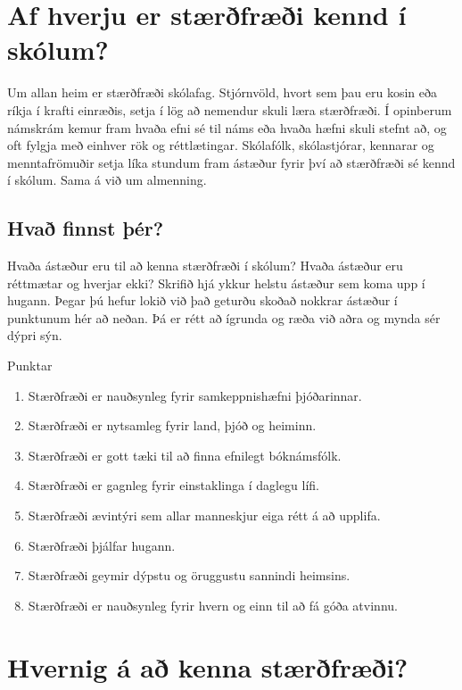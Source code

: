 \documentclass[
  icelandic,
]{book}
\providecommand{\tightlist}{%
  \setlength{\itemsep}{0pt}\setlength{\parskip}{0pt}}
\begin{document}
\section{Af hverju er stærðfræði kennd í skólum?}\label{af-hverju-stae}

Um allan heim er stærðfræði skólafag. Stjórnvöld, hvort sem þau eru kosin eða ríkja í krafti einræðis, setja í lög að nemendur skuli læra stærðfræði. Í opinberum námskrám kemur fram hvaða efni sé til náms eða hvaða hæfni skuli stefnt að, og oft fylgja með einhver rök og réttlætingar. Skólafólk, skólastjórar, kennarar og menntafrömuðir setja líka stundum fram ástæður fyrir því að stærðfræði sé kennd í skólum. Sama á við um almenning.

\subsection{Hvað finnst þér?}\label{thinar-astaedur}

Hvaða ástæður eru til að kenna stærðfræði í skólum? Hvaða ástæður eru réttmætar og hverjar ekki? Skrifið hjá ykkur helstu ástæður sem koma upp í hugann. Þegar þú hefur lokið við það geturðu skoðað nokkrar ástæður í punktunum hér að neðan. Þá er rétt að ígrunda og ræða við aðra og mynda sér dýpri sýn.

Punktar

\begin{enumerate}
\def\labelenumi{\alph{enumi}.}
\tightlist
\item
  Stærðfræði er nauðsynleg fyrir samkeppnishæfni þjóðarinnar.
\item
  Stærðfræði er nytsamleg fyrir land, þjóð og heiminn.
\item
  Stærðfræði er gott tæki til að finna efnilegt bóknámsfólk.
\item
  Stærðfræði er gagnleg fyrir einstaklinga í daglegu lífi.
\item
  Stærðfræði ævintýri sem allar manneskjur eiga rétt á að upplifa.
\item
  Stærðfræði þjálfar hugann.
\item
  Stærðfræði geymir dýpstu og öruggustu sannindi heimsins.
\item
  Stærðfræði er nauðsynleg fyrir hvern og einn til að fá góða atvinnu.
\end{enumerate}

\section{Hvernig á að kenna stærðfræði?}\label{hvernig-stae}
\end{document}
